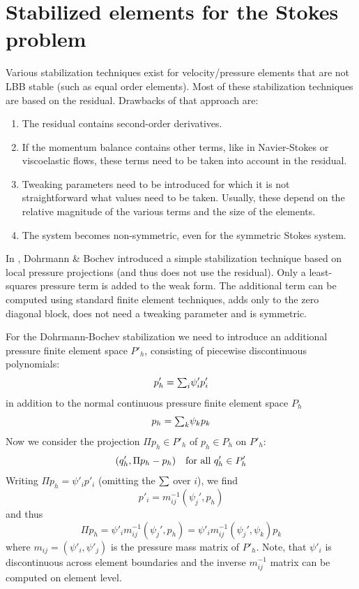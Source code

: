 
\def\headdate{12th July 2021}

\section{Stabilized elements for the Stokes problem}
\label{sec:stabilizedstokes}
Various stabilization techniques exist for velocity/pressure elements that are
not LBB stable (such as equal order elements). Most of these stabilization
techniques are based on the
residual. Drawbacks of that approach are:
\begin{enumerate}
 \item The residual contains second-order derivatives.
 \item If the momentum balance contains other terms, like in Navier-Stokes or
       viscoelastic flows, these terms need to be taken into
       account in the residual.
 \item Tweaking parameters need to be introduced for
       which it is not straightforward what values need to be taken.
       Usually, these depend on the relative magnitude of the various terms and
       the size of the elements.
  \item The system becomes non-symmetric, even for the symmetric Stokes system.
\end{enumerate}
In \cite{Dohrmann04}, Dohrmann \& Bochev introduced a simple stabilization
technique based on local pressure projections (and thus does not use the
residual). Only
a least-squares pressure term is added to the weak form.
The additional term can be
computed using standard finite element techniques, adds only to the zero
diagonal block, does not need a tweaking parameter and is symmetric.

For the Dohrmann-Bochev stabilization we need to introduce an additional
pressure finite element space $P'_h$, consisting of piecewise discontinuous
polynomials:
\[
     p_h'={\textstyle\sum}_i \psi'_i p'_i
\]
in addition to the normal continuous pressure finite element space $P_h$
\[
     p_h={\textstyle\sum}_k \psi_k p_k
\]
Now we consider the projection $\Pi p_h\in P'_h$ of $p_h\in P_h$ on $P'_h$:
\[
    (q'_h,\Pi p_h-p_h) \text{\quad for all }q_h'\in P'_h
\]
Writing $\Pi p_h= \psi'_i p'_i$ (omitting the ${\textstyle\sum}$ over $i$), we find
\[
    p'_i=m^{-1}_{ij}(\psi_j',p_h)
\]
and thus
\[
   \Pi p_h = \psi'_i m^{-1}_{ij}(\psi_j',p_h)=
                \psi'_i m^{-1}_{ij}(\psi_j',\psi_k)p_k
\]
where $m_{ij}=(\psi'_i,\psi'_j)$ is the pressure mass matrix of $P'_h$. Note,
that $\psi'_i$ is discontinuous across element boundaries and the inverse
$m^{-1}_{ij}$ matrix can be computed on element level.

